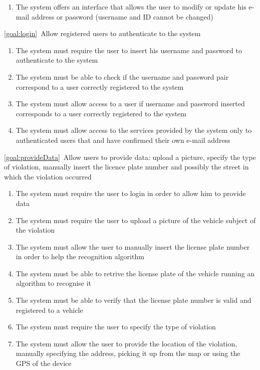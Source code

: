 \begin{description}
\begin{enumerate}[label=\textbf{R\arabic*}]
   				\item The system offers an interface that allows the user to modify or update his e-mail address or password (username and ID cannot be changed)
  			\end{enumerate}
		\item \ref{goal:login}\ Allow registered users to authenticate to the system
			\begin{enumerate}[resume*]
  				\item The system must require the user to insert his username and password to authenticate to the system
   				\item The system must be able to check if the username and password pair
   				correspond to a user correctly registered to the system
   				\item The system must allow access to a user if username and password inserted corresponds to a user correctly registered to the system
   				\item The system must allow access to the services provided by the system only to authenticated users that and have confirmed their own e-mail address
			\end{enumerate}
		\item \ref{goal:provideData}\ Allow users to provide data: upload a picture, specify the type of violation, manually insert the licence plate number and possibly the street in which the violation occurred
			\begin{enumerate}[resume*]
				\item The system must require the user to login in order to allow him to provide data
				\item The system must require the user to upload a picture of the vehicle subject of the violation
  				\item The system must allow the user to manually insert the license plate number in order to help the recognition algorithm
  				\item The system must be able to retrive the license plate of the vehicle running an algorithm to recognise it
  				\item The system must be able to verify that the license plate number is valid and registered to a vehicle
  				\item The system must require the user to specify the type of violation
  				\item The system must allow the user to provide the location of the violation, manually specifying the address, picking it up from the map or using the GPS of the device

\end{enumerate}
\end{description}
